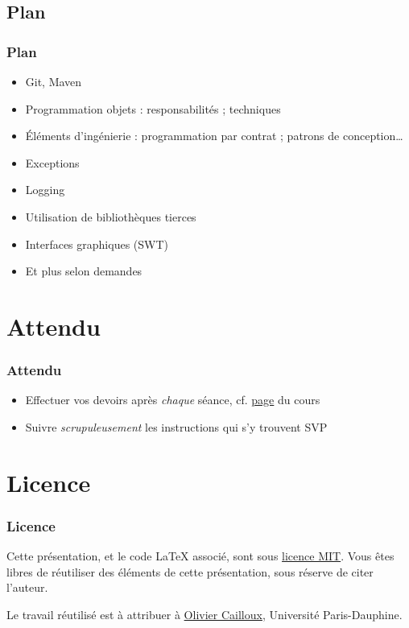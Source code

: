 \documentclass[english, french]{beamer}
\begin{document}
\subsection{Plan}
\begin{frame}
	\frametitle{Plan}
	\begin{itemize}
		\item Git, Maven
		\item Programmation objets : responsabilités ; techniques
		\item Éléments d’ingénierie : programmation par contrat ; patrons de conception…
		\item Exceptions
		\item Logging
		\item Utilisation de bibliothèques tierces
		\item Interfaces graphiques (SWT)
		\item Et plus selon demandes
	\end{itemize}
\end{frame}

\section{Attendu}
\begin{frame}
	\frametitle{Attendu}
	\begin{itemize}
		\item Effectuer vos devoirs après \emph{chaque} séance, cf. \href{https://github.com/oliviercailloux/java-course/blob/master/Divers/L3a.adoc}{page} du cours
		\item Suivre \emph{scrupuleusement} les instructions qui s’y trouvent SVP
	\end{itemize}
\end{frame}

\appendix
\section{Licence}
\begin{frame}
	\frametitle{Licence}
	Cette présentation, et le code LaTeX associé, sont sous \href{https://opensource.org/licenses/MIT}{licence MIT}. Vous êtes libres de réutiliser des éléments de cette présentation, sous réserve de citer l’auteur.
	
	Le travail réutilisé est à attribuer à \href{http://www.lamsade.dauphine.fr/~ocailloux/}{Olivier Cailloux}, Université Paris-Dauphine.
\end{frame}
\end{document}
